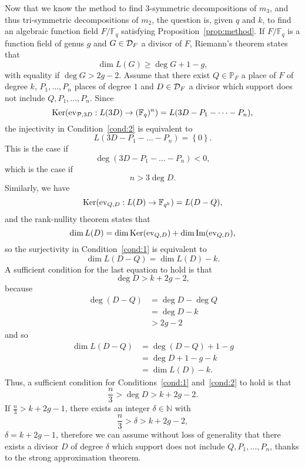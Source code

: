 \documentclass[a4paper,11pt]{article}
\begin{document}
Now that we know the method to find $3$-symmetric decompositions of $m_3$, and thus
tri-symmetric decompositions of $m_2$, the question is, given $q$ and $k$, to
find an algebraic function field $F/\mathbb{F}_{q}$ satisfying
Proposition~\ref{prop:method}. If $F/\mathbb{F}_q$ is a function field of genus
$g$ and $G\in\mathcal{D}_F$ a divisor of $F$, Riemann's theorem states that
\[
  \dim L(G) \geq \deg G + 1 - g,
\]
with equality if $\deg G > 2g - 2$. Assume that there exist $Q\in\mathbb{P}_F$ a
place of $F$ of degree $k$, $P_1, \dots, P_n$ places of degree $1$ and
$D\in\mathcal{D}_F$ a divisor which support does not include $Q, P_1, \dots, P_n$. Since
\[
  \operatorname{Ker}(\operatorname{ev}_{\mathcal{P}, 3D}:L(3D)\to(\mathbb{F}_{q})^n) = L(3D-P_1-\dots-P_n),
\]
the injectivity in Condition~\eqref{cond:2} is equivalent to
\[
  L(3D-P_1-\dots-P_n)=\left\{ 0 \right\}.
\]
This is the case if
\[
\deg(3D-P_1-\dots-P_n)<0,
\]
which is the case if
\[
  n > 3\deg D.
\]
Similarly, we have
\[
  \operatorname{Ker}(\operatorname{ev}_{Q, D}:L(D)\to\mathbb{F}_{q^k}) = L(D-Q),
\]
and the rank-nullity theorem states that
\[
  \dim L(D) = \dim\operatorname{Ker}(\operatorname{ev}_{Q, D})+\dim\operatorname{Im}(\operatorname{ev}_{Q, D}),
\]
so the surjectivity in Condition~\eqref{cond:1} is equivalent to
\[
  \dim L(D-Q) = \dim L(D) - k.
\]
A sufficient condition for the last equation to hold is that
\[
  \deg D > k+ 2g - 2,
\]
because
\begin{equation*}
  \begin{split}
  \deg(D-Q) &= \deg D - \deg Q\\
  &= \deg D - k\\
  &> 2g - 2
  \end{split}
\end{equation*}
and so
\begin{equation*}
  \begin{split}
    \dim L(D-Q) &= \deg(D-Q)+1-g\\
    &=\deg D+1-g-k\\
    &=\dim L(D)-k.
  \end{split}
\end{equation*}
Thus, a sufficient condition for Conditions~\eqref{cond:1} and~\eqref{cond:2} to
hold is that
\[
  \frac{n}{3} > \deg D > k + 2g - 2.
\]
If $\frac{n}{3}>k + 2g -1$, there exists an integer $\delta\in\mathbb{N}$ with
\[
  \frac{n}{3} > \delta > k +2g -2,
\]
\eg $\delta=k+2g-1$, therefore we can assume without loss of generality that there
exists a divisor $D$ of degree $\delta$ which support does not include $Q, P_1,
\dots, P_n$, thanks to the strong approximation theorem.
\end{document}
